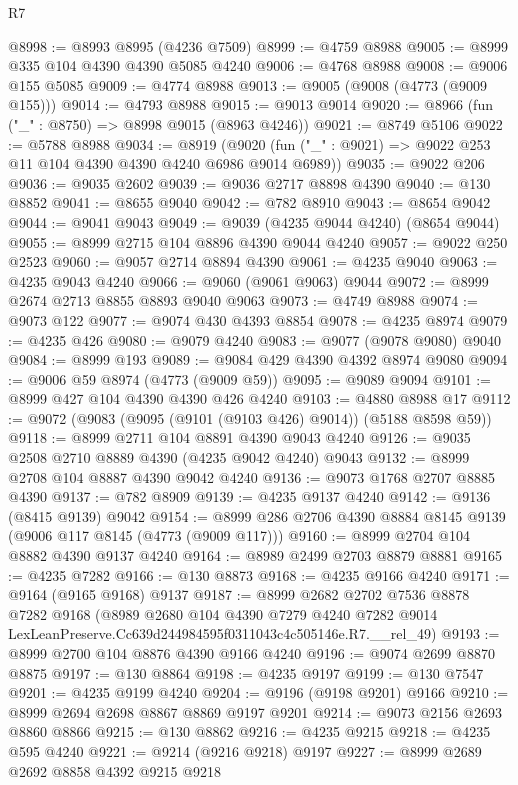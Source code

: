 \begin{lexlean}{R7}
\begin{coremodule}
@8998 := @8993 @8995 (@4236 @7509)
@8999 := @4759 @8988
@9005 := @8999 @335 @104 @4390 @4390 @5085 @4240
@9006 := @4768 @8988
@9008 := @9006 @155 @5085
@9009 := @4774 @8988
@9013 := @9005 (@9008 (@4773 (@9009 @155)))
@9014 := @4793 @8988
@9015 := @9013 @9014
@9020 := @8966 (fun ("_" : @8750) => @8998 @9015 (@8963 @4246))
@9021 := @8749 @5106
@9022 := @5788 @8988
@9034 := @8919
    (@9020 (fun ("_" : @9021) => @9022 @253 @11 @104 @4390 @4390 @4240 @6986 @9014 @6989))
@9035 := @9022 @206
@9036 := @9035 @2602
@9039 := @9036 @2717 @8898 @4390
@9040 := @130 @8852
@9041 := @8655 @9040
@9042 := @782 @8910
@9043 := @8654 @9042
@9044 := @9041 @9043
@9049 := @9039 (@4235 @9044 @4240) (@8654 @9044)
@9055 := @8999 @2715 @104 @8896 @4390 @9044 @4240
@9057 := @9022 @250 @2523
@9060 := @9057 @2714 @8894 @4390
@9061 := @4235 @9040
@9063 := @4235 @9043 @4240
@9066 := @9060 (@9061 @9063) @9044
@9072 := @8999 @2674 @2713 @8855 @8893 @9040 @9063
@9073 := @4749 @8988
@9074 := @9073 @122
@9077 := @9074 @430 @4393 @8854
@9078 := @4235 @8974
@9079 := @4235 @426
@9080 := @9079 @4240
@9083 := @9077 (@9078 @9080) @9040
@9084 := @8999 @193
@9089 := @9084 @429 @4390 @4392 @8974 @9080
@9094 := @9006 @59 @8974 (@4773 (@9009 @59))
@9095 := @9089 @9094
@9101 := @8999 @427 @104 @4390 @4390 @426 @4240
@9103 := @4880 @8988 @17
@9112 := @9072 (@9083 (@9095 (@9101 (@9103 @426) @9014)) (@5188 @8598 @59))
@9118 := @8999 @2711 @104 @8891 @4390 @9043 @4240
@9126 := @9035 @2508 @2710 @8889 @4390 (@4235 @9042 @4240) @9043
@9132 := @8999 @2708 @104 @8887 @4390 @9042 @4240
@9136 := @9073 @1768 @2707 @8885 @4390
@9137 := @782 @8909
@9139 := @4235 @9137 @4240
@9142 := @9136 (@8415 @9139) @9042
@9154 := @8999 @286 @2706 @4390 @8884 @8145 @9139 (@9006 @117 @8145 (@4773 (@9009 @117)))
@9160 := @8999 @2704 @104 @8882 @4390 @9137 @4240
@9164 := @8989 @2499 @2703 @8879 @8881
@9165 := @4235 @7282
@9166 := @130 @8873
@9168 := @4235 @9166 @4240
@9171 := @9164 (@9165 @9168) @9137
@9187 := @8999
    @2682
    @2702
    @7536
    @8878
    @7282
    @9168
    (@8989
      @2680
      @104
      @4390
      @7279
      @4240
      @7282
      @9014
      LexLeanPreserve.Cc639d244984595f0311043c4c505146e.R7.__rel_49)
@9193 := @8999 @2700 @104 @8876 @4390 @9166 @4240
@9196 := @9074 @2699 @8870 @8875
@9197 := @130 @8864
@9198 := @4235 @9197
@9199 := @130 @7547
@9201 := @4235 @9199 @4240
@9204 := @9196 (@9198 @9201) @9166
@9210 := @8999 @2694 @2698 @8867 @8869 @9197 @9201
@9214 := @9073 @2156 @2693 @8860 @8866
@9215 := @130 @8862
@9216 := @4235 @9215
@9218 := @4235 @595 @4240
@9221 := @9214 (@9216 @9218) @9197
@9227 := @8999 @2689 @2692 @8858 @4392 @9215 @9218

\end{coremodule}
\end{lexlean}
